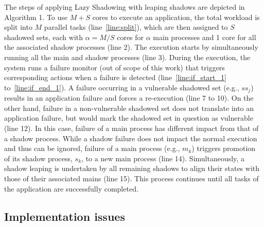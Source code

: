 The steps of applying Lazy Shadowing with leaping shadows are depicted in Algorithm 1.
To use $M+S$ cores to execute an application, the total workload is split into $M$ parallel tasks (line~\ref{line:split}), %
 which are then assigned to $S$ shadowed sets, each with $\alpha=M/S$ cores for $\alpha$ main processes and 1 core for all the associated shadow processes (line 2).  
The execution starts by simultaneously running all the main and shadow processes (line 3).
During the execution,
the system runs a failure monitor (out of scope of this work) that triggers corresponding actions when a failure is detected (line~\ref{line:if_start_1} to~\ref{line:if_end_1}). %
A failure occurring in a vulnerable shadowed set (e.g., $ss_j$) results in an application failure %
 and forces a re-execution (line 7 to 10).
On the other hand, failure in a non-vulnerable shadowed set
does not translate into an application failure, but would mark the shadowed set in question as vulnerable (line 12). In this case, failure of a main process has different impact from that of a  shadow process.  While a shadow 
failure does not impact the normal execution and thus can be ignored, failure of a main process %
(e.g., $m_k$) triggers promotion of its shadow process, $s_k$, to a new main process (line 14). Simultaneously, a shadow leaping is undertaken by all remaining shadows to align their states with those of their associated mains (line 15).  
This process continues until all tasks of the application are successfully completed.

\subsection{Implementation issues}

